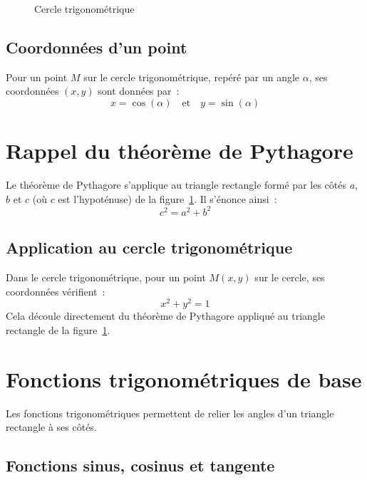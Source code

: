 \documentclass{article}
\begin{document}
\begin{figure}[h]
    \label{fig:trigo}
    \caption{Cercle trigonométrique}
\end{figure}

\subsection{Coordonnées d'un point}
Pour un point $M$ sur le cercle trigonométrique, repéré par un angle $\alpha$, ses coordonnées $(x, y)$ sont données par~:
\[
x = \cos(\alpha) \quad \text{et} \quad y = \sin(\alpha)
\]

\section{Rappel du théorème de Pythagore}

Le théorème de Pythagore s'applique au triangle rectangle formé par les côtés \(a\), \(b\) et \(c\) (où \(c\) est l'hypoténuse) de la figure~\ref{fig:trigo}.
Il s'énonce ainsi~:
\[
c^2 = a^2 + b^2
\]

\subsection{Application au cercle trigonométrique}
Dans le cercle trigonométrique, pour un point $M (x,y)$ sur le cercle, ses coordonnées vérifient~:
\[
x^2 + y^2 = 1
\]
Cela découle directement du théorème de Pythagore appliqué au triangle rectangle de la figure~\ref{fig:trigo}.

\section{Fonctions trigonométriques de base}

Les fonctions trigonométriques permettent de relier les angles d'un triangle rectangle à ses côtés.

\subsection{Fonctions sinus, cosinus et tangente}
\end{document}
